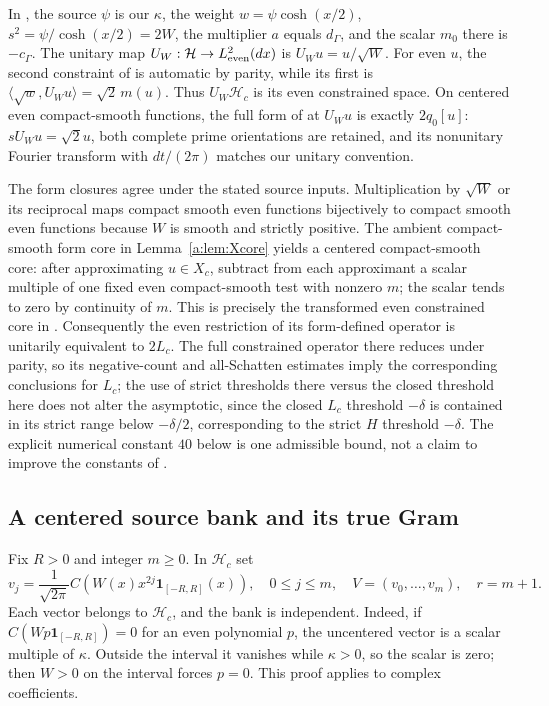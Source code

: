 \documentclass[11pt,a4paper]{article}
\numberwithin{equation}{section}
\theoremstyle{definition}\newtheorem{definition}[theorem]{Definition}
\theoremstyle{remark}\newtheorem{remark}[theorem]{Remark}
\newcommand{\Hh}{\mathcal H}\newcommand{\Hw}{\mathcal H}
\begin{document}
In \cite[Section~2, equations (4)--(6)]{vfourSchubr}, the source $\psi$ is our $\kappa$, the weight $w=\psi\cosh(x/2)$, $s^2=\psi/\cosh(x/2)=2W$, the multiplier $a$ equals $d_\Gamma$, and the scalar $m_0$ there is $-c_\Gamma$. The unitary map $U_W:\Hh\to L^2_{\rm even}(dx)$ is $U_Wu=u/\sqrt W$. For even $u$, the second constraint of \cite{vfourSchubr} is automatic by parity, while its first is $\langle\sqrt w,U_Wu\rangle=\sqrt2\,m(u)$. Thus $U_W\Hh_c$ is its even constrained space. On centered even compact-smooth functions, the full form of \cite{vfourSchubr} at $U_Wu$ is exactly $2q_0[u]$: $sU_Wu=\sqrt2u$, both complete prime orientations are retained, and its nonunitary Fourier transform with $dt/(2\pi)$ matches our unitary convention.

The form closures agree under the stated source inputs. Multiplication by $\sqrt W$ or its reciprocal maps compact smooth even functions bijectively to compact smooth even functions because $W$ is smooth and strictly positive. The ambient compact-smooth form core in Lemma~\ref{a:lem:Xcore} yields a centered compact-smooth core: after approximating $u\in X_c$, subtract from each approximant a scalar multiple of one fixed even compact-smooth test with nonzero $m$; the scalar tends to zero by continuity of $m$. This is precisely the transformed even constrained core in \cite{vfourSchubr}. Consequently the even restriction of its form-defined operator is unitarily equivalent to $2L_c$. The full constrained operator there reduces under parity, so its negative-count and all-Schatten estimates imply the corresponding conclusions for $L_c$; the use of strict thresholds there versus the closed threshold here does not alter the asymptotic, since the closed $L_c$ threshold $-\delta$ is contained in its strict range below $-\delta/2$, corresponding to the strict $H$ threshold $-\delta$. The explicit numerical constant $40$ below is one admissible bound, not a claim to improve the constants of \cite{vfourSchubr}.

\subsection{A centered source bank and its true Gram}\label{vfourD:bank}
Fix $R>0$ and integer $m\ge0$. In $\Hh_c$ set
\begin{equation}\label{vfourD:bankdef}
 v_j=\frac1{\sqrt{2\pi}}C\!\left(W(x)x^{2j}\mathbf1_{[-R,R]}(x)\right),\quad 0\le j\le m,\quad V=(v_0,\ldots,v_m),\quad r=m+1.
\end{equation}
Each vector belongs to $\Hh_c$, and the bank is independent. Indeed, if $C(Wp\mathbf1_{[-R,R]})=0$ for an even polynomial $p$, the uncentered vector is a scalar multiple of $\kappa$. Outside the interval it vanishes while $\kappa>0$, so the scalar is zero; then $W>0$ on the interval forces $p=0$. This proof applies to complex coefficients.
\end{document}
